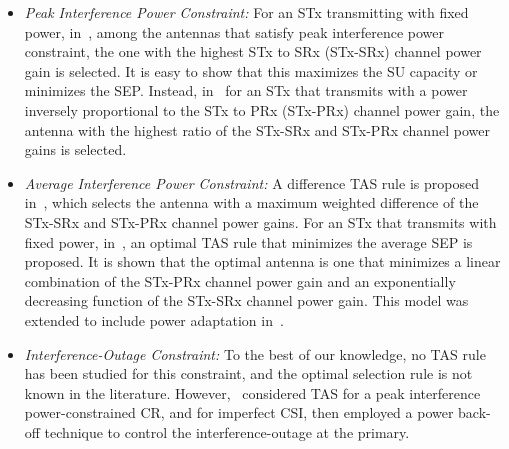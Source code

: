 \documentclass[12pt,draftcls,peerreview,onecolumn]{IEEEtran}
\begin{document}
\begin{itemize}
\item {\em Peak Interference Power Constraint:} For an STx transmitting with fixed power, in~\cite{Hanif_2015_globecom}, among the antennas that satisfy peak interference power constraint, the one with the highest STx to SRx (STx-SRx) channel power gain is selected. It is easy to show that this maximizes the SU capacity or minimizes the SEP. Instead, in~\cite{Wang_2010_TWC} for an  STx that transmits with a power inversely proportional to the STx to PRx (STx-PRx) channel power gain, the antenna with the highest ratio of the STx-SRx and STx-PRx channel power gains is selected. 
%
\item {\em Average Interference Power Constraint:} A difference TAS rule is proposed in~\cite{Wang_2011_TCom}, which selects the antenna with a maximum weighted difference of the STx-SRx and STx-PRx channel power gains. For an STx that transmits with fixed power, in~\cite{Sarvendranath_2013_TCOM}, an optimal TAS rule that minimizes the average SEP is proposed. It is shown that the optimal antenna is one that minimizes a linear combination of the STx-PRx channel power gain and an exponentially decreasing function of the STx-SRx channel power gain. This model was extended to include power adaptation in~\cite{Sarvendranath_2014_TCOM}. %

%

\item{\em Interference-Outage Constraint:} To the best of our knowledge, no TAS rule has been studied for this constraint, and the optimal selection rule is not known in the literature. However,~\cite{Peng_2016_eurasip} considered TAS for a peak interference power-constrained CR, and for imperfect CSI, then employed a power back-off technique to control the interference-outage at the primary.

\end{itemize}
\end{document}
